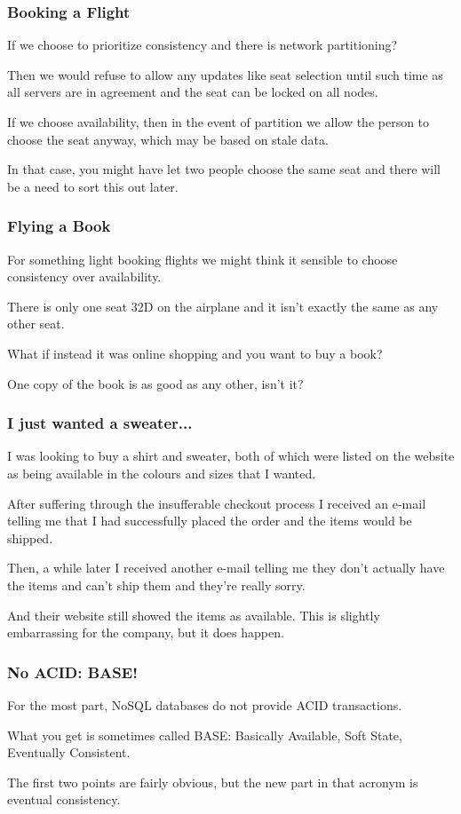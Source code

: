 \begin{frame}
\frametitle{Booking a Flight}

If we choose to prioritize consistency and there is network partitioning? 

Then we would refuse to allow any updates like seat selection until such time as all servers are in agreement and the seat can be locked on all nodes. 

If we choose availability, then in the event of partition we allow the person to choose the seat anyway, which may be based on stale data. 

In that case, you might have let two people choose the same seat and there will be a need to sort this out later. 

\end{frame}

\begin{frame}
\frametitle{Flying a Book}
For something light booking flights we might think it sensible to choose consistency over availability.

There is only one seat 32D on the airplane and it isn't exactly the same as any other seat. 

What if instead it was online shopping and you want to buy a book? 

One copy of the book is as good as any other, isn't it?

\end{frame}



\begin{frame}
\frametitle{I just wanted a sweater...}

I was looking to buy a shirt and sweater, both of which were listed on the website as being available in the colours and sizes that I wanted. 

After suffering through the insufferable checkout process I received an e-mail telling me that I had successfully placed the order and the items would be shipped. 

Then, a while later I received another e-mail telling me they don't actually have the items and can't ship them and they're really sorry. 

And their website still showed the items as available. This is slightly embarrassing for the company, but it does happen.

\end{frame}



\begin{frame}
\frametitle{No ACID: BASE!}

For the most part, NoSQL databases do not provide ACID transactions. 

What you get is sometimes called BASE: Basically Available, Soft State, Eventually Consistent. 

The first two points are fairly obvious, but the new part in that acronym is \alert{eventual consistency}.

\end{frame}



